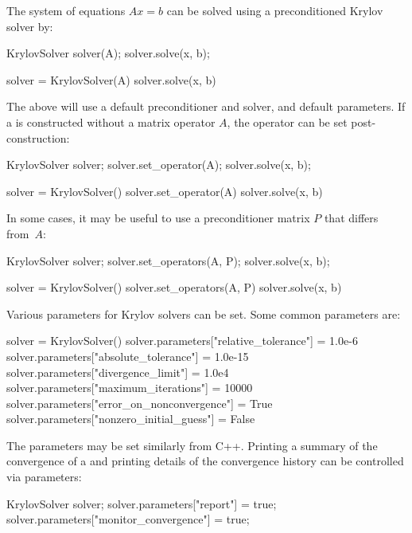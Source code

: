 The system of equations $Ax = b$ can be solved using a preconditioned
Krylov solver by:


\begin{c++}
KrylovSolver solver(A);
solver.solve(x, b);
\end{c++}

\begin{python}
solver = KrylovSolver(A)
solver.solve(x, b)
\end{python}
The above will use a default preconditioner and solver, and default
parameters. If a  is constructed without a matrix
operator $A$, the operator can be set post-construction:

\begin{c++}
KrylovSolver solver;
solver.set_operator(A);
solver.solve(x, b);
\end{c++}

\begin{python}
solver = KrylovSolver()
solver.set_operator(A)
solver.solve(x, b)
\end{python}
In some cases, it may be useful to use a preconditioner matrix $P$ that
differs from~$A$:

\begin{c++}
KrylovSolver solver;
solver.set_operators(A, P);
solver.solve(x, b);
\end{c++}

\begin{python}
solver = KrylovSolver()
solver.set_operators(A, P)
solver.solve(x, b)
\end{python}
Various parameters for Krylov solvers can be set. Some common parameters
are:

\begin{python}
solver = KrylovSolver()
solver.parameters["relative_tolerance"]      = 1.0e-6
solver.parameters["absolute_tolerance"]      = 1.0e-15
solver.parameters["divergence_limit"]        = 1.0e4
solver.parameters["maximum_iterations"]      = 10000
solver.parameters["error_on_nonconvergence"] = True
solver.parameters["nonzero_initial_guess"]   = False
\end{python}
The parameters may be set similarly from C++. Printing a summary of
the convergence of a  and printing details of the
convergence history can be controlled via parameters:

\begin{c++}
KrylovSolver solver;
solver.parameters["report"] = true;
solver.parameters["monitor_convergence"] = true;
\end{c++}

